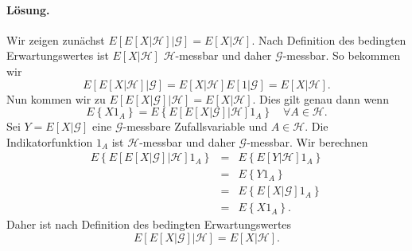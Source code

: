\paragraph*{Lösung.} Wir zeigen zunächst 
$E\left[ E\left[ X | \mathcal H \right] | \mathcal G \right]=E \left[ X | \mathcal H \right]$.
Nach Definition des bedingten Erwartungswertes ist $E\left[ X| \mathcal H \right]$ 
$\mathcal H$-messbar und daher $\mathcal G$-messbar. So bekommen wir 
\begin{equation*}
	E\left[ E\left[ X | \mathcal H \right] | \mathcal G \right] =
	E\left[ X| \mathcal H \right] E\left[ 1|\mathcal G \right] = 
	E \left[ X | \mathcal H \right ].
\end{equation*}
Nun kommen wir zu 
$E\left[ E\left[ X | \mathcal G \right] | \mathcal H \right]=E \left[ X | \mathcal H \right]$.
Dies gilt genau dann wenn 
\begin{equation*}
	E\left\{ X 1_A \right\} 
	= E\left\{ E\left[ E\left[ X|\mathcal G \right]|\mathcal H \right] 1_A \right\}  
	\quad \forall A\in\mathcal H.
\end{equation*}
Sei $Y=E\left[ X|\mathcal G \right]$ eine $\mathcal G$-messbare Zufallsvariable und
$A\in\mathcal H$. Die Indikatorfunktion $1_A$ ist $\mathcal H$-messbar und daher
$\mathcal G$-messbar. Wir berechnen
\begin{eqnarray*}
	E\left\{ E\left[ E\left[ X|\mathcal G \right]|\mathcal H \right] 1_A \right\} &=& 
	E\left\{ E\left[ Y|\mathcal H \right] 1_A \right\} \\
	&=& E\left\{ Y 1_A \right\} \\
	&=& E\left\{ E\left[ X|\mathcal G \right] 1_A \right\} \\
    &=& E\left\{ X 1_A \right\}. 
\end{eqnarray*}
Daher ist nach Definition des bedingten Erwartungswertes
\begin{equation*}
    E\left[ E\left[ X | \mathcal G \right] | \mathcal H \right]=E \left[ X |
    \mathcal H \right].
\end{equation*}


